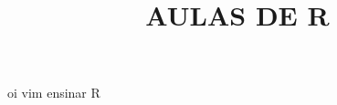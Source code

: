 \documentclass[
  letterpaper,
  DIV=11,
  numbers=noendperiod]{scrartcl}
\title{AULAS DE R}
\author{}
\date{}
\renewcommand*\contentsname{Table of contents}
\newcommand\contentsname{Table of contents}
\begin{document}
\maketitle

\renewcommand*\contentsname{Table of contents}
{
\setcounter{tocdepth}{3}
\tableofcontents
}

oi vim ensinar R
\end{document}
